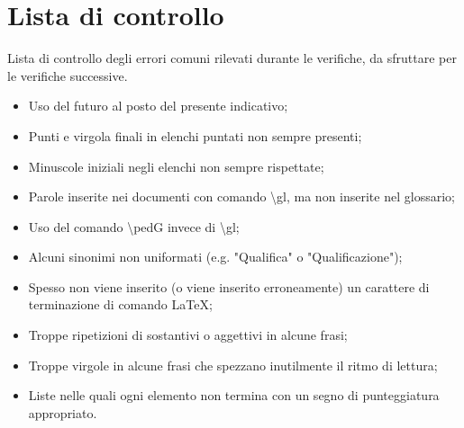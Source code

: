 \documentclass[../NormeDiProgetto.tex]{subfiles}
\begin{document}
	\section{Lista di controllo}
		Lista di controllo degli errori comuni rilevati durante le verifiche, da sfruttare per le verifiche
		successive.
		\begin{itemize}
			\item Uso del futuro al posto del presente indicativo;
			\item Punti e virgola finali in elenchi puntati non sempre presenti;
			\item Minuscole iniziali negli elenchi non sempre rispettate;
			\item Parole inserite nei documenti con comando \textbackslash gl, ma non inserite nel glossario;
			\item Uso del comando \textbackslash ped{G} invece di \textbackslash gl;
			\item Alcuni sinonimi non uniformati (e.g. "Qualifica" o "Qualificazione");
			\item Spesso non viene inserito (o viene inserito erroneamente) un carattere di terminazione di
			comando \LaTeX;
			\item Troppe ripetizioni di sostantivi o aggettivi in alcune frasi;
			\item Troppe virgole in alcune frasi che spezzano inutilmente il ritmo di lettura;
			\item Liste nelle quali ogni elemento non termina con un segno di punteggiatura appropriato.
		\end{itemize}
\end{document}

